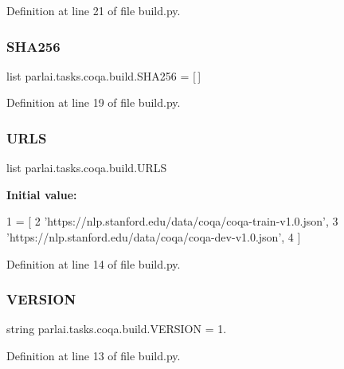 Definition at line 21 of file build.\+py.

\mbox{\label{namespaceparlai_1_1tasks_1_1coqa_1_1build_abac5f27f3ac9554a50b41b0088ec3fbb}} 
\subsubsection{\texorpdfstring{S\+H\+A256}{SHA256}}
{\footnotesize\ttfamily list parlai.\+tasks.\+coqa.\+build.\+S\+H\+A256 = \mbox{[}$\,$\mbox{]}}



Definition at line 19 of file build.\+py.

\mbox{\label{namespaceparlai_1_1tasks_1_1coqa_1_1build_a637aa09169ca463f7944e7ec9554f0e0}} 
\subsubsection{\texorpdfstring{U\+R\+LS}{URLS}}
{\footnotesize\ttfamily list parlai.\+tasks.\+coqa.\+build.\+U\+R\+LS}

{\bfseries Initial value\+:}
\begin{DoxyCode}
1 =  [
2     \textcolor{stringliteral}{'https://nlp.stanford.edu/data/coqa/coqa-train-v1.0.json'},
3     \textcolor{stringliteral}{'https://nlp.stanford.edu/data/coqa/coqa-dev-v1.0.json'},
4 ]
\end{DoxyCode}


Definition at line 14 of file build.\+py.

\mbox{\label{namespaceparlai_1_1tasks_1_1coqa_1_1build_acfdb0f28d99e915a52ffeaa441f932f4}} 
\subsubsection{\texorpdfstring{V\+E\+R\+S\+I\+ON}{VERSION}}
{\footnotesize\ttfamily string parlai.\+tasks.\+coqa.\+build.\+V\+E\+R\+S\+I\+ON = \textquotesingle{}1.\textquotesingle{}}



Definition at line 13 of file build.\+py.

